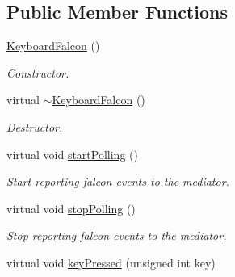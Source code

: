 \subsection*{Public Member Functions}
\begin{DoxyCompactItemize}
\item 
\hypertarget{classKeyboardFalcon_a7b79d2129b322900cc65f6f250469875}{
\hyperlink{classKeyboardFalcon_a7b79d2129b322900cc65f6f250469875}{KeyboardFalcon} ()}
\label{classKeyboardFalcon_a7b79d2129b322900cc65f6f250469875}

\begin{DoxyCompactList}\small\item\em Constructor. \item\end{DoxyCompactList}\item 
\hypertarget{classKeyboardFalcon_a1db3b6a58d955521253dfc7067a88f36}{
virtual \hyperlink{classKeyboardFalcon_a1db3b6a58d955521253dfc7067a88f36}{$\sim$KeyboardFalcon} ()}
\label{classKeyboardFalcon_a1db3b6a58d955521253dfc7067a88f36}

\begin{DoxyCompactList}\small\item\em Destructor. \item\end{DoxyCompactList}\item 
\hypertarget{classKeyboardFalcon_af9a2c400cb05910d806861eb8af566f9}{
virtual void \hyperlink{classKeyboardFalcon_af9a2c400cb05910d806861eb8af566f9}{startPolling} ()}
\label{classKeyboardFalcon_af9a2c400cb05910d806861eb8af566f9}

\begin{DoxyCompactList}\small\item\em Start reporting falcon events to the mediator. \item\end{DoxyCompactList}\item 
\hypertarget{classKeyboardFalcon_adf5bf86dd3610843b0db8b8795f6049b}{
virtual void \hyperlink{classKeyboardFalcon_adf5bf86dd3610843b0db8b8795f6049b}{stopPolling} ()}
\label{classKeyboardFalcon_adf5bf86dd3610843b0db8b8795f6049b}

\begin{DoxyCompactList}\small\item\em Stop reporting falcon events to the mediator. \item\end{DoxyCompactList}\item 
\hypertarget{classKeyboardFalcon_a496423ca690aa227530ac8e3f4ce06a0}{
virtual void \hyperlink{classKeyboardFalcon_a496423ca690aa227530ac8e3f4ce06a0}{keyPressed} (unsigned int key)}
\label{classKeyboardFalcon_a496423ca690aa227530ac8e3f4ce06a0}


\end{DoxyCompactItemize}
